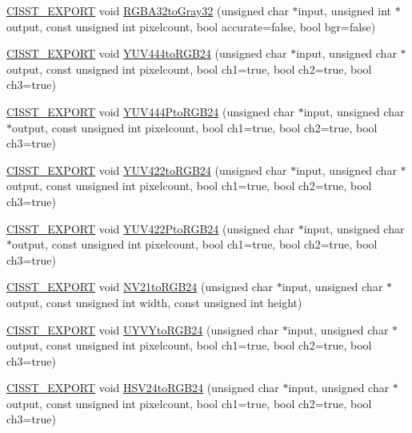 \begin{DoxyCompactItemize}
\item 
\hyperlink{cmn_export_macros_8h_a99393e0c3ac434b2605235bbe20684f8}{C\+I\+S\+S\+T\+\_\+\+E\+X\+P\+O\+R\+T} void \hyperlink{namespacesvl_converter_af5b67f08a4b804d5204d98bb0ee5557f}{R\+G\+B\+A32to\+Gray32} (unsigned char $\ast$input, unsigned int $\ast$output, const unsigned int pixelcount, bool accurate=false, bool bgr=false)
\item 
\hyperlink{cmn_export_macros_8h_a99393e0c3ac434b2605235bbe20684f8}{C\+I\+S\+S\+T\+\_\+\+E\+X\+P\+O\+R\+T} void \hyperlink{namespacesvl_converter_ad344ee1b5377e0ef400da695584ebd53}{Y\+U\+V444to\+R\+G\+B24} (unsigned char $\ast$input, unsigned char $\ast$output, const unsigned int pixelcount, bool ch1=true, bool ch2=true, bool ch3=true)
\item 
\hyperlink{cmn_export_macros_8h_a99393e0c3ac434b2605235bbe20684f8}{C\+I\+S\+S\+T\+\_\+\+E\+X\+P\+O\+R\+T} void \hyperlink{namespacesvl_converter_adaf832870c71537af4542ae677d7c1ad}{Y\+U\+V444\+Pto\+R\+G\+B24} (unsigned char $\ast$input, unsigned char $\ast$output, const unsigned int pixelcount, bool ch1=true, bool ch2=true, bool ch3=true)
\item 
\hyperlink{cmn_export_macros_8h_a99393e0c3ac434b2605235bbe20684f8}{C\+I\+S\+S\+T\+\_\+\+E\+X\+P\+O\+R\+T} void \hyperlink{namespacesvl_converter_aa50bea9710e0c790d0966fad98376319}{Y\+U\+V422to\+R\+G\+B24} (unsigned char $\ast$input, unsigned char $\ast$output, const unsigned int pixelcount, bool ch1=true, bool ch2=true, bool ch3=true)
\item 
\hyperlink{cmn_export_macros_8h_a99393e0c3ac434b2605235bbe20684f8}{C\+I\+S\+S\+T\+\_\+\+E\+X\+P\+O\+R\+T} void \hyperlink{namespacesvl_converter_a223a6406dbb0d166db1daacd95d64dea}{Y\+U\+V422\+Pto\+R\+G\+B24} (unsigned char $\ast$input, unsigned char $\ast$output, const unsigned int pixelcount, bool ch1=true, bool ch2=true, bool ch3=true)
\item 
\hyperlink{cmn_export_macros_8h_a99393e0c3ac434b2605235bbe20684f8}{C\+I\+S\+S\+T\+\_\+\+E\+X\+P\+O\+R\+T} void \hyperlink{namespacesvl_converter_a29fb7339f7fa53fae9745d2575a724ba}{N\+V21to\+R\+G\+B24} (unsigned char $\ast$input, unsigned char $\ast$output, const unsigned int width, const unsigned int height)
\item 
\hyperlink{cmn_export_macros_8h_a99393e0c3ac434b2605235bbe20684f8}{C\+I\+S\+S\+T\+\_\+\+E\+X\+P\+O\+R\+T} void \hyperlink{namespacesvl_converter_acc95903b2333fce1161aac393bee5288}{U\+Y\+V\+Yto\+R\+G\+B24} (unsigned char $\ast$input, unsigned char $\ast$output, const unsigned int pixelcount, bool ch1=true, bool ch2=true, bool ch3=true)
\item 
\hyperlink{cmn_export_macros_8h_a99393e0c3ac434b2605235bbe20684f8}{C\+I\+S\+S\+T\+\_\+\+E\+X\+P\+O\+R\+T} void \hyperlink{namespacesvl_converter_aefe398f1f6c73774eaf685b9c2fe3aeb}{H\+S\+V24to\+R\+G\+B24} (unsigned char $\ast$input, unsigned char $\ast$output, const unsigned int pixelcount, bool ch1=true, bool ch2=true, bool ch3=true)
\end{DoxyCompactItemize}


